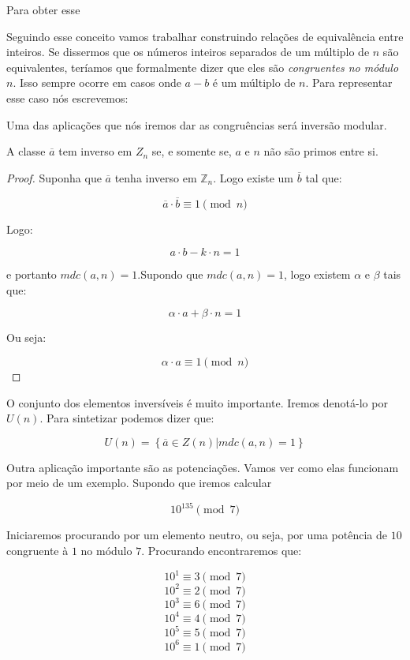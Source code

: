 Para obter esse 




Seguindo esse conceito vamos trabalhar construindo rela\c{c}\~oes de equival\^encia entre inteiros. Se dissermos que os n\'umeros inteiros separados de um m\'ultiplo de $n$ s\~ao equivalentes, ter\'iamos que formalmente dizer que eles s\~ao \textit{congruentes no m\'odulo $n$}. Isso sempre ocorre em casos onde $a-b$ \'e um m\'ultiplo de $n$. Para representar esse caso n\'os escrevemos:



Uma das aplica\c{c}\~oes que n\'os iremos dar as congru\^encias ser\'a invers\~ao modular. 

\begin{Th}\label{inversao}
A classe $\overline{a}$ tem inverso em $Z_n$ se, e somente se, $a$ e $n$ n\~ao s\~ao primos entre si.
\end{Th}

\begin{proof}
Suponha que $\overline{a}$ tenha inverso em $\mathbb{Z}_n$. Logo existe um $\overline{b}$ tal que:

$$\overline{a} \cdot \overline{b} \equiv 1 \pmod{n}$$

Logo:

$$a \cdot b - k \cdot n = 1 $$

e portanto $mdc(a,n) = 1$.Supondo que $mdc(a,n) = 1$, logo existem $\alpha$ e $\beta$ tais que:

$$\alpha \cdot a + \beta \cdot n = 1$$

Ou seja:

$$\alpha \cdot a \equiv 1 \pmod{n}$$
\end{proof}

O conjunto dos elementos invers\'iveis \'e muito importante. Iremos denot\'a-lo por $U(n)$. Para sintetizar podemos dizer que:

$$U(n) = \left\{\overline{a} \in Z(n) | mdc(a,n) = 1\right\}$$

Outra aplica\c{c}\~ao importante s\~ao as potencia\c{c}\~oes. Vamos ver como elas funcionam por meio de um exemplo. Supondo que iremos calcular

$$10^{135} \pmod{7}$$

Iniciaremos procurando por um elemento neutro, ou seja, por uma pot\^encia de $10$ congruente \`a $1$ no m\'odulo $7$. Procurando encontraremos que:

  $$10^1 \equiv 3 \pmod{7}$$  
	$$10^2 \equiv 2 \pmod{7}$$
	$$10^3 \equiv 6 \pmod{7}$$ 
	$$10^4 \equiv 4 \pmod{7}$$ 
	$$10^5 \equiv 5 \pmod{7}$$ 
	$$10^6 \equiv 1 \pmod{7}$$ 
	
